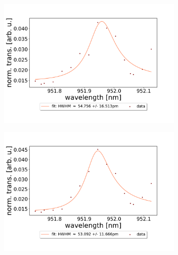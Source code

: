 \begin{figure}[h!]
    \centering
    \begin{subfigure}[b]{0.49\textwidth}
        \includegraphics[width=\textwidth]{figures/results/double fano fits/20250326/83um_M3:M5_fit_1.pdf}
        \caption{}
        \label{fig:83um_M3:M5_fit_1}
    \end{subfigure}
    \begin{subfigure}[b]{0.49\textwidth}
        \includegraphics[width=\textwidth]{figures/results/double fano fits/20250326/83um_M3:M5_fit_2.pdf}
        \caption{}
        \label{fig:83um_M3:M5_fit_2}
    \end{subfigure}
    \begin{subfigure}[b]{0.49\textwidth}

\end{subfigure}
\end{figure}
